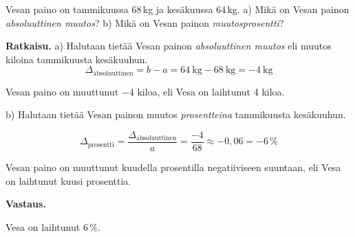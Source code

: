 \begin{esimerkki}
    Vesan paino on tammikuussa $68$\,kg ja kesäkuussa $64$\,kg.
    \newline a) Mikä on Vesan painon \textit{absoluuttinen muutos}?
    \newline b) Mikä on Vesan painon \textit{muutosprosentti}?
    
    \textbf{Ratkaisu.}
a) Halutaan tietää Vesan painon \textit{absoluuttinen muutos} eli muutos kiloina tammikuusta kesäkuuhun.
    \[
       \Delta_{\text{absoluuttinen}} = b - a = 64~\text{kg} - 68~\text{kg} = -4~\text{kg}
    \]

    Vesan paino on muuttunut $-4$ kiloa, eli Vesa on laihtunut 4 kiloa.

b) Halutaan tietää Vesan painon muutos \textit{prosentteina} tammikuusta kesäkuuhun.
    
    \[
        \Delta_{\text{prosentti}}
        = \frac{\Delta_{\text{absoluuttinen}}}{a}
        = \frac{-4}{68}
        \approx -0,06
        = -6\,\% 
    \]
    
    Vesan paino on muuttunut kuudella prosentilla negatiiviseen suuntaan,
    eli Vesa on laihtunut kuusi prosenttia.
    
    \textbf{Vastaus.}
    
    Vesa on laihtunut $6\,\%$.
\end{esimerkki}

    
